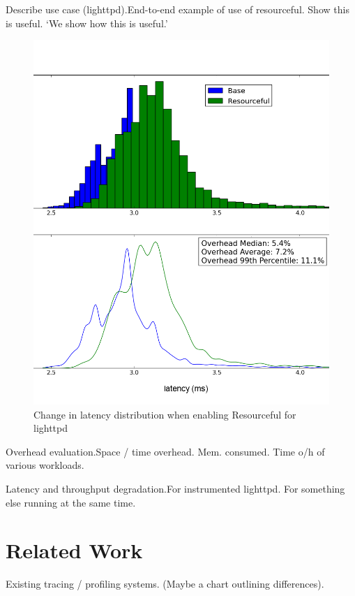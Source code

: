 \documentclass[letterpaper,twocolumn,10pt]{article}
\newcommand{\pname}{Resourceful}
\begin{document}
Describe use case (lighttpd).\newline End-to-end example of use of resourceful.
Show this is useful. `We show how this is useful.'

\begin{figure}[ht!] 
	\centering 
	\includegraphics[width=1.1\columnwidth]{dist_and_fit}
	\caption{Change in latency distribution when enabling \pname{ }for lighttpd} 
	\label{fig:experiment1}
\end{figure}

Overhead evaluation.\newline Space / time overhead. Mem. consumed. Time o/h of
various workloads.

Latency and throughput degradation.\newline For instrumented lighttpd. For
something else running at the same time.


\section{Related Work} Existing tracing / profiling systems. (Maybe a chart
outlining differences).
\end{document}
